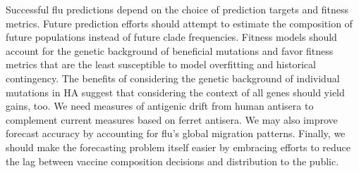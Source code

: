 Successful flu predictions depend on the choice of prediction targets and fitness metrics.
Future prediction efforts should attempt to estimate the composition of future populations instead of future clade frequencies.
Fitness models should account for the genetic background of beneficial mutations and favor fitness metrics that are the least susceptible to model overfitting and historical contingency.
The benefits of considering the genetic background of individual mutations in HA suggest that considering the context of all genes should yield gains, too.
We need measures of antigenic drift from human antisera to complement current measures based on ferret antisera.
We may also improve forecast accuracy by accounting for flu's global migration patterns.
Finally, we should make the forecasting problem itself easier by embracing efforts to reduce the lag between vaccine composition decisions and distribution to the public.
